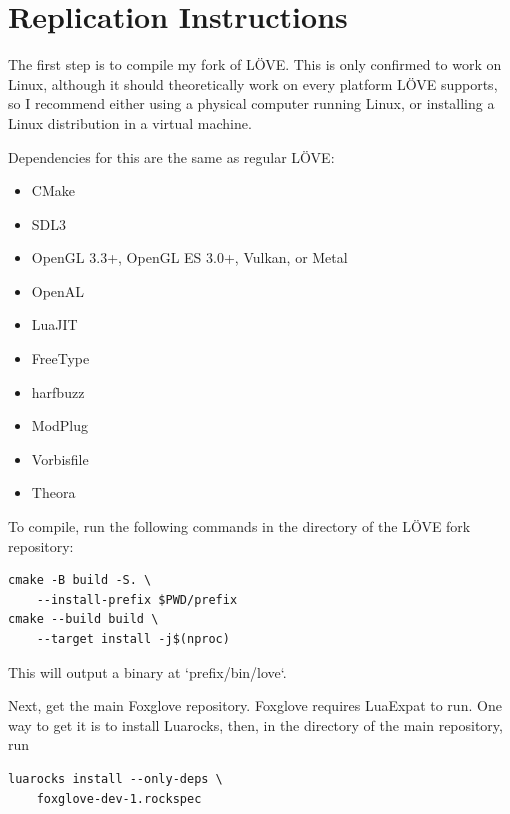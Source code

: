 \documentclass[10pt,twocolumn]{article}
\begin{document}

\section{Replication Instructions}

The first step is to compile my fork of LÖVE. This is only confirmed
to work on Linux, although it should theoretically work on every platform
LÖVE supports, so I recommend either using a physical computer running
Linux, or installing a Linux distribution in a virtual machine.

Dependencies for this are the same as regular LÖVE:
\begin{itemize}
    \item CMake
    \item SDL3
    \item OpenGL 3.3+, OpenGL ES 3.0+, Vulkan, or Metal
    \item OpenAL
    \item LuaJIT
    \item FreeType
    \item harfbuzz
    \item ModPlug
    \item Vorbisfile
    \item Theora
\end{itemize}

To compile, run the following commands in the directory of the LÖVE
fork repository:
\begin{verbatim}
cmake -B build -S. \
    --install-prefix $PWD/prefix
cmake --build build \
    --target install -j$(nproc)
\end{verbatim}

This will output a binary at `prefix/bin/love`.

Next, get the main Foxglove repository.
Foxglove requires LuaExpat to run.
One way to get it is to install Luarocks, then, in the directory of
the main repository, run
\begin{verbatim}
luarocks install --only-deps \
    foxglove-dev-1.rockspec
\end{verbatim}
\end{document}
